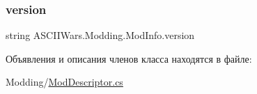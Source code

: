 \subsubsection{\texorpdfstring{version}{version}}
{\footnotesize\ttfamily string A\+S\+C\+I\+I\+Wars.\+Modding.\+Mod\+Info.\+version}



Объявления и описания членов класса находятся в файле\+:\begin{DoxyCompactItemize}
\item 
Modding/\hyperlink{_mod_descriptor_8cs}{Mod\+Descriptor.\+cs}\end{DoxyCompactItemize}
